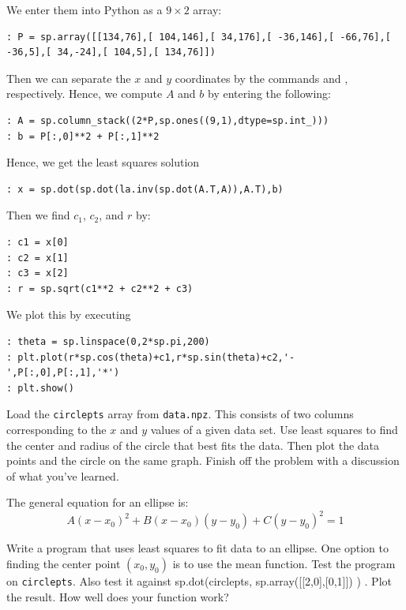 We enter them into Python as a $9\times 2$ array:
\begin{lstlisting}[style=python]
: P = sp.array([[134,76],[ 104,146],[ 34,176],[ -36,146],[ -66,76],[ -36,5],[ 34,-24],[ 104,5],[ 134,76]])
\end{lstlisting}
Then we can separate the $x$ and $y$ coordinates by the commands  and , respectively.  Hence, we compute $A$ and $b$ by entering the following:
\begin{lstlisting}[style=python]
: A = sp.column_stack((2*P,sp.ones((9,1),dtype=sp.int_)))
: b = P[:,0]**2 + P[:,1]**2
\end{lstlisting}
Hence, we get the least squares solution
\begin{lstlisting}[style=python]
: x = sp.dot(sp.dot(la.inv(sp.dot(A.T,A)),A.T),b)
\end{lstlisting}
Then we find $c_1$, $c_2$, and $r$ by:
\begin{lstlisting}[style=python]
: c1 = x[0]
: c2 = x[1]
: c3 = x[2]
: r = sp.sqrt(c1**2 + c2**2 + c3)
\end{lstlisting}
We plot this by executing
\begin{lstlisting}[style=python]
: theta = sp.linspace(0,2*sp.pi,200)
: plt.plot(r*sp.cos(theta)+c1,r*sp.sin(theta)+c2,'-',P[:,0],P[:,1],'*')
: plt.show()
\end{lstlisting}


\begin{problem}
Load the \texttt{circlepts} array from \texttt{data.npz}.
This consists of two columns corresponding to the $x$ and $y$ values of a given data set.  Use least squares to find the center and radius of the circle that best fits the data.  Then plot the data points and the circle on the same graph.  Finish off the problem with a discussion of what you've learned.
\end{problem}

\begin{problem}
The general equation for an ellipse is:
\[
A(x-x_0)^2 + B(x-x_0)(y-y_0) + C(y-y_0)^2 = 1
\]

Write a program that uses least squares to fit data to an ellipse. One option to finding the center point $(x_0,y_0)$ is to use the mean function. Test the program on \texttt{circlepts}. Also test it against sp.dot(circlepts, sp.array([[2,0],[0,1]]) ) . Plot the result. How well does your function work?
\end{problem}

